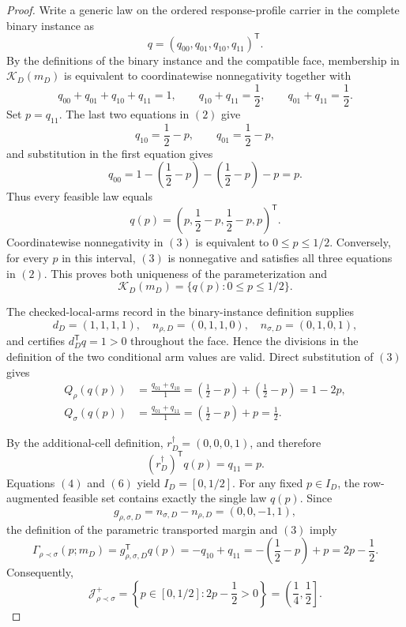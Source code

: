 \documentclass{article}
\begin{document}
\begin{proof}
Write a generic law on the ordered response-profile carrier in the complete binary instance as
\[
q=(q_{00},q_{01},q_{10},q_{11})^{\mathsf T}.
\]
By the definitions of the binary instance and the compatible face, membership in \(\mathcal K_D(m_D)\) is equivalent to coordinatewise nonnegativity together with
\[
q_{00}+q_{01}+q_{10}+q_{11}=1,
\qquad
q_{10}+q_{11}=\frac12,
\qquad
q_{01}+q_{11}=\frac12.
\tag{2}
\]
Set \(p=q_{11}\).  The last two equations in \((2)\) give
\[
q_{10}=\frac12-p,
\qquad
q_{01}=\frac12-p,
\]
and substitution in the first equation gives
\[
q_{00}
=1-\left(\frac12-p\right)-\left(\frac12-p\right)-p
=p.
\]
Thus every feasible law equals
\[
q(p)=\left(p,\frac12-p,\frac12-p,p\right)^{\mathsf T}.
\tag{3}
\]
Coordinatewise nonnegativity in \((3)\) is equivalent to \(0\leq p\leq 1/2\).  Conversely, for every \(p\) in this interval, \((3)\) is nonnegative and satisfies all three equations in \((2)\).  This proves both uniqueness of the parameterization and
\[
\mathcal K_D(m_D)=\{q(p):0\leq p\leq1/2\}.
\tag{4}
\]

The checked-local-arms record in the binary-instance definition supplies
\[
d_D=(1,1,1,1),
\quad
n_{\rho,D}=(0,1,1,0),
\quad
n_{\sigma,D}=(0,1,0,1),
\]
and certifies \(d_D^{\mathsf T}q=1>0\) throughout the face.  Hence the divisions in the definition of the two conditional arm values are valid.  Direct substitution of \((3)\) gives
\[
\begin{aligned}
Q_\rho(q(p))
&=\frac{q_{01}+q_{10}}{1}
=\left(\frac12-p\right)+\left(\frac12-p\right)
=1-2p,\\
Q_\sigma(q(p))
&=\frac{q_{01}+q_{11}}{1}
=\left(\frac12-p\right)+p
=\frac12.
\end{aligned}
\tag{5}
\]

By the additional-cell definition, \(r_D^\dagger=(0,0,0,1)\), and therefore
\[
(r_D^\dagger)^{\mathsf T}q(p)=q_{11}=p.
\tag{6}
\]
Equations \((4)\) and \((6)\) yield \(I_D=[0,1/2]\).  For any fixed \(p\in I_D\), the row-augmented feasible set contains exactly the single law \(q(p)\).  Since
\[
g_{\rho,\sigma,D}=n_{\sigma,D}-n_{\rho,D}=(0,0,-1,1),
\]
the definition of the parametric transported margin and \((3)\) imply
\[
\Gamma_{\rho\prec\sigma}(p;m_D)
=g_{\rho,\sigma,D}^{\mathsf T}q(p)
=-q_{10}+q_{11}
=-\left(\frac12-p\right)+p
=2p-\frac12.
\tag{7}
\]
Consequently,
\[
\mathcal J_{\rho\prec\sigma}^+
=\left\{p\in[0,1/2]:2p-\frac12>0\right\}
=\left(\frac14,\frac12\right].
\tag{8}
\]


\end{proof}
\end{document}
